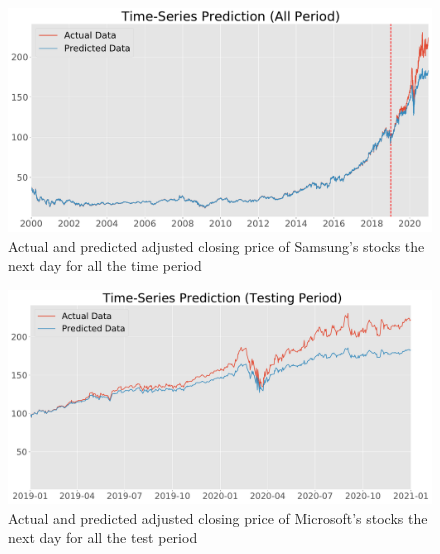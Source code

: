 \documentclass[12pt]{article}
\begin{document}
\begin{figure}
    \centering
    \includegraphics[width=\textwidth]{images/prediction_base_all_microsoft.pdf}
    \caption{Actual and predicted adjusted closing price of Samsung's stocks the next day for all the time period}
    \label{fig:all_microsoft}
\end{figure}
\begin{figure}
    \centering
    \includegraphics[width=\textwidth]{images/prediction_base_test_microsoft.pdf}
    \caption{Actual and predicted adjusted closing price of Microsoft's stocks the next day for all the test period}
    \label{fig:test_microsoft}
\end{figure}
\end{document}
